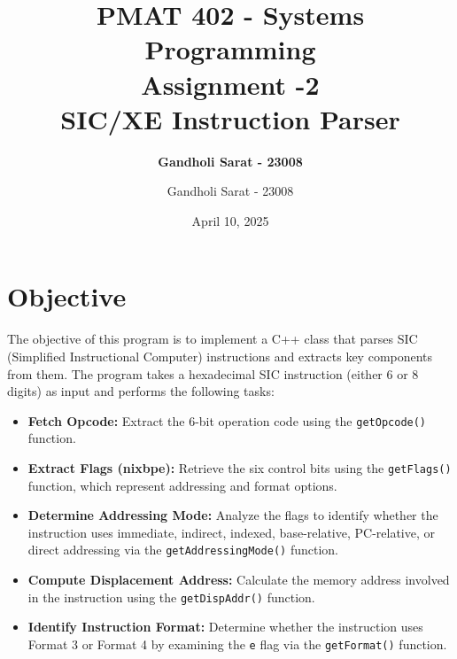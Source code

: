 \documentclass[12pt]{article}
\title{\textbf{PMAT 402 - Systems Programming \\ Assignment -2 \\ SIC/XE Instruction Parser}}
\author{\textbf{Gandholi Sarat - 23008}}
\author{Gandholi Sarat - 23008}
\date{April 10, 2025}
\begin{document}
\renewcommand{\thesection}{\Roman{section}}
\renewcommand{\thesubsection}{\Roman{section}.\Roman{subsection}}

\maketitle
\tableofcontents
\newpage

\section{Objective}

The objective of this program is to implement a C++ class that parses SIC (Simplified Instructional Computer) instructions and extracts key components from them. The program takes a hexadecimal SIC instruction (either 6 or 8 digits) as input and performs the following tasks:

\begin{itemize}
    \item \textbf{Fetch Opcode:} Extract the 6-bit operation code using the \texttt{getOpcode()} function.
    \item \textbf{Extract Flags (nixbpe):} Retrieve the six control bits using the \texttt{getFlags()} function, which represent addressing and format options.
    \item \textbf{Determine Addressing Mode:} Analyze the flags to identify whether the instruction uses immediate, indirect, indexed, base-relative, PC-relative, or direct addressing via the \texttt{getAddressingMode()} function.
    \item \textbf{Compute Displacement Address:} Calculate the memory address involved in the instruction using the \texttt{getDispAddr()} function.
    \item \textbf{Identify Instruction Format:} Determine whether the instruction uses Format 3 or Format 4 by examining the \texttt{e} flag via the \texttt{getFormat()} function.
\end{itemize}
\end{document}
